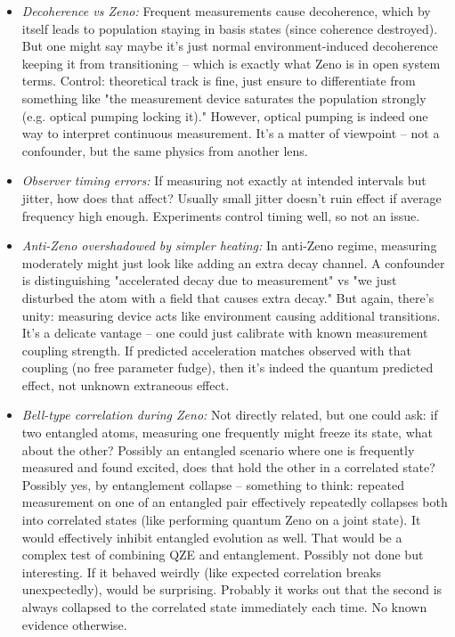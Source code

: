 \documentclass[11pt]{article}
\begin{document}
\begin{itemize}
\item 
\textit{Decoherence vs Zeno:} Frequent measurements cause decoherence, which by itself leads to population staying in basis states (since coherence destroyed). But one might say maybe it's just normal environment-induced decoherence keeping it from transitioning – which is exactly what Zeno is in open system terms. Control: theoretical track is fine, just ensure to differentiate from something like "the measurement device saturates the population strongly (e.g. optical pumping locking it)." However, optical pumping is indeed one way to interpret continuous measurement. It's a matter of viewpoint – not a confounder, but the same physics from another lens.




\item 
\textit{Observer timing errors:} If measuring not exactly at intended intervals but jitter, how does that affect? Usually small jitter doesn't ruin effect if average frequency high enough. Experiments control timing well, so not an issue.




\item 
\textit{Anti-Zeno overshadowed by simpler heating:} In anti-Zeno regime, measuring moderately might just look like adding an extra decay channel. A confounder is distinguishing "accelerated decay due to measurement" vs "we just disturbed the atom with a field that causes extra decay." But again, there's unity: measuring device acts like environment causing additional transitions. It's a delicate vantage – one could just calibrate with known measurement coupling strength. If predicted acceleration matches observed with that coupling (no free parameter fudge), then it's indeed the quantum predicted effect, not unknown extraneous effect.




\item 
\textit{Bell-type correlation during Zeno:} Not directly related, but one could ask: if two entangled atoms, measuring one frequently might freeze its state, what about the other? Possibly an entangled scenario where one is frequently measured and found excited, does that hold the other in a correlated state? Possibly yes, by entanglement collapse – something to think: repeated measurement on one of an entangled pair effectively repeatedly collapses both into correlated states (like performing quantum Zeno on a joint state). It would effectively inhibit entangled evolution as well. That would be a complex test of combining QZE and entanglement. Possibly not done but interesting. If it behaved weirdly (like expected correlation breaks unexpectedly), would be surprising. Probably it works out that the second is always collapsed to the correlated state immediately each time. No known evidence otherwise.




\end{itemize}
\end{document}
